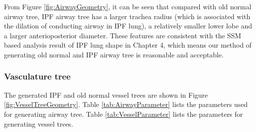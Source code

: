 From Figure \ref{fig:AirwayGeometry}, it can be seen that compared with old normal airway tree, IPF airway tree has a larger trachea radius (which is associated with the dilation of conducting airway in IPF lung), a relatively smaller lower lobe and a larger anterioposterior diameter. These features are consistent with the SSM based analysis result of IPF lung shape in Chapter 4, which means our method of generating old normal and IPF airway tree is reasonable and acceptable.

\subsubsection{Vasculature tree}
The generated IPF and old normal vessel trees are shown in Figure \ref{fig:VesselTreeGeometry}. Table \ref{tab:AirwayParameter} lists the parameters used for generating airway tree. Table \ref{tab:VesselParameter} lists the parameters for generating vessel trees. 

